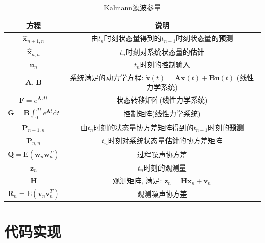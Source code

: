 \documentclass[12pt]{article}
\begin{document}
\begin{table}[H]
\centering
\caption{Kalmann滤波参量}
\label{tab:basic_elements}
\begin{tabular}{cc} 
\hline 			
方程 & 说明  \\  
\hline 
$\hat{\bm{x}}_{n+1,n}$  & 由$t_n$时刻状态量得到的$t_{n+1}$时刻状态量的\textbf{预测} \\
$\hat{\bm{x}}_{n,n}$    & $t_n$时刻对系统状态量的\textbf{估计} \\
$\bm{u}_n$ & $t_n$时刻的控制输入 \\
$\bm{A}$, $\bm{B}$ & 系统满足的动力学方程: $\dot{\bm{x}}(t) = \bm{A}\bm{x}(t) + \bm{B} \bm{u}(t)$ (线性力学系统) \\
$\bm{F} = e^{\bm{A}\Delta t}$ & 状态转移矩阵(线性力学系统) \\
$\bm{G} = \bm{B} \int_{0}^{\Delta t} e^{\bm{A}t} \mathrm{d}t$ & 控制矩阵(线性力学系统) \\
$\bm{P}_{n+1, n}$ & 由$t_n$时刻的状态量协方差矩阵得到的$t_{n+1}$时刻的\textbf{预测} \\
$\bm{P}_{n,n}$ & $t_n$时刻对系统状态量\textbf{估计}的协方差矩阵 \\
$\bm{Q} = \mathrm{E}(\bm{w}_n \bm{w}_n^T)$ & 过程噪声协方差 \\
$\bm{z}_n$ & $t_n$时刻的观测量 \\
$\bm{H}$ & 观测矩阵, 满足: $\bm{z}_n = \bm{H} \bm{x}_n + \bm{v}_n$ \\
$\bm{R}_n = \mathrm{E}(\bm{v}_n \bm{v}_n^T)$ & 观测噪声协方差 \\
\hline 
\end{tabular}
\end{table}

\section{代码实现}
\end{document}
